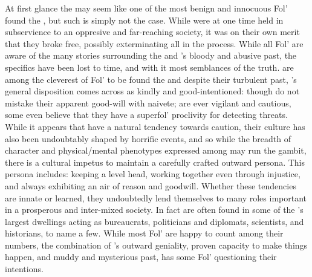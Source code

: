 \documentclass[twoside, 12pt, letterpaper]{report}\usepackage[]{graphicx}\usepackage[]{color}
\begin{document}
\begin{multicols*}{2}
\nsubsection{\mouse}
At first glance the \mouse may seem like one of the most benign and innocuous Fol' found \ooi the \mw, but such is simply not the case. While \mouse were at one time held in subservience to an oppresive and far-reaching \rat society, it was on their own merit that they broke free, possibly exterminating all \rat in the process. While all Fol' are aware of the many stories surrounding the \rat and \mouse's bloody and abusive past, the specifics have been lost to time, and with it most semblances of the truth. \mouse are among the cleverest of Fol' to be found \ooi the \mw and despite their turbulent past, \mouse's general disposition comes across as  kindly and good-intentioned: though do not mistake their apparent good-will with naivete; \mouse are ever vigilant and cautious, some even believe that they have a superfol' proclivity for detecting threats. While it appears that \mouse have a natural tendency towards caution, their culture has also been undoubtably shaped by horrific events, and so while the breadth of character and physical/mental phenotypes expressed among \mouse may run the gambit, there is a cultural impetus to maintain a carefully crafted outward persona. This persona includes: keeping a level head, working together even through injustice, and always exhibiting an air of reason and goodwill. Whether these tendencies are innate or learned, they undoubtedly lend themselves to many roles important in a prosperous and inter-mixed society. In fact \mouse are often found in some of the \mw's largest dwellings acting as bureaucrats, politicians and diplomats, scientists, and historians, to name a few. While most Fol' are happy to count \mouse among their numbers, the combination of \mouse's outward geniality, proven capacity to make things happen, and muddy and mysterious past, has some Fol' questioning their intentions.


\end{multicols*}
\end{document}
